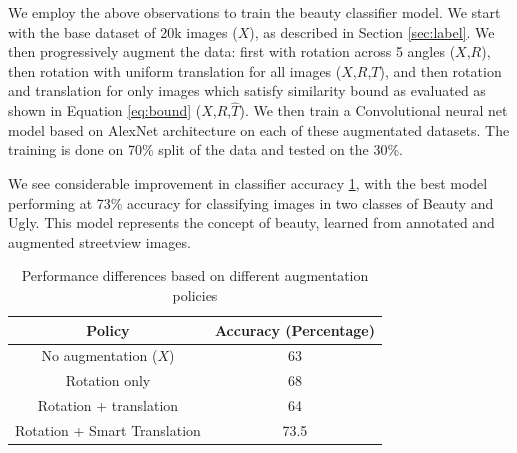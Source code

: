 We employ the above observations to train the beauty classifier model. We start with  the base dataset of 20k images ($X$), as described in Section 
\ref{sec:label}. We then progressively augment the data: first with rotation across 5 angles ($X$,$R$), then rotation with uniform translation for all images ($X$,$R$,$T$), and then rotation and translation for only images which satisfy similarity bound as evaluated as shown in Equation \ref{eq:bound} ($X$,$R$,$\hat{T}$). 
We then train a Convolutional neural net model based on AlexNet architecture \cite{szegedy2015going} on each of these augmentated datasets. The training is done on 70\% split of the data and tested on the 30\%. 

We see considerable improvement in classifier accuracy \ref{tab:classifier}, with the best model performing at 73\% accuracy for classifying images in two classes of Beauty and Ugly. 
This model represents the concept of beauty, learned from annotated and augmented streetview images. 


\begin{table}[h]
	\centering
	\begin{tabular}{|c|c|}
		\hline
		\textbf{Policy} & \textbf{Accuracy (Percentage)}\\
		\hline
		No augmentation ($X$) & 63 \\
		\hline
		Rotation only & 68 \\
		\hline
		Rotation + translation  & 64 \\
		\hline
		Rotation + Smart Translation & 73.5 \\
		\hline
		
		\hline
	\end{tabular}
	\caption{Performance differences based on different augmentation policies}
	\label{tab:classifier}
    \vspace{-10mm}
\end{table}



